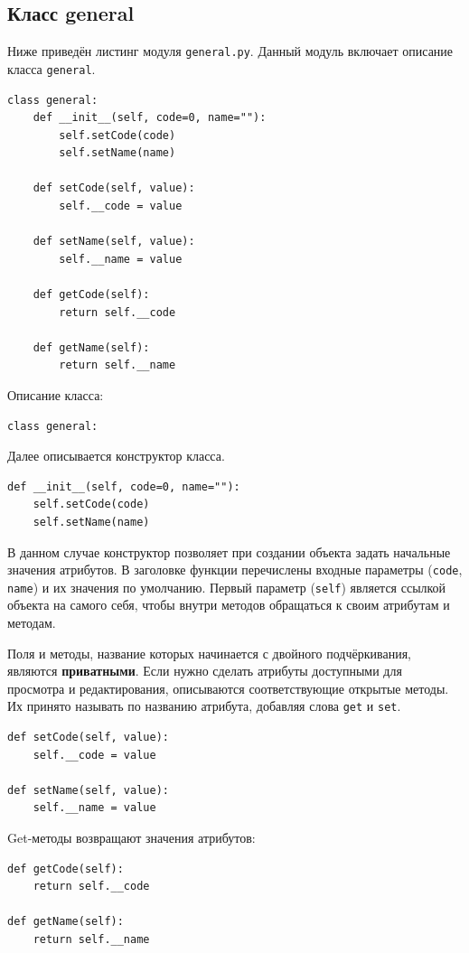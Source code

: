 \documentclass[a4paper,14pt]{extarticle}
\begin{document}
\subsection{Класс general}

Ниже приведён листинг модуля \texttt{general.py}. Данный модуль включает описание класса \texttt{general}.

\begin{lstlisting}[caption={Модуль \texttt{general.py}}]
class general:
    def __init__(self, code=0, name=""):
        self.setCode(code)
        self.setName(name)

    def setCode(self, value):
        self.__code = value

    def setName(self, value):
        self.__name = value

    def getCode(self):
        return self.__code

    def getName(self):
        return self.__name
\end{lstlisting}

Описание класса:
\begin{lstlisting}
class general:
\end{lstlisting}

Далее описывается конструктор класса.
\begin{lstlisting}
def __init__(self, code=0, name=""):
    self.setCode(code)
    self.setName(name)
\end{lstlisting}

В данном случае конструктор позволяет при создании объекта задать начальные значения атрибутов. В заголовке функции перечислены входные параметры (\texttt{code}, \texttt{name}) и их значения по умолчанию. Первый параметр (\texttt{self}) является ссылкой объекта на самого себя, чтобы внутри методов обращаться к своим атрибутам и методам.

Поля и методы, название которых начинается с двойного подчёркивания, являются \textbf{приватными}. Если нужно сделать атрибуты доступными для просмотра и редактирования, описываются соответствующие открытые методы. Их принято называть по названию атрибута, добавляя слова \texttt{get} и \texttt{set}.

\begin{lstlisting}
def setCode(self, value):
    self.__code = value

def setName(self, value):
    self.__name = value
\end{lstlisting}

Get-методы возвращают значения атрибутов:
\begin{lstlisting}
def getCode(self):
    return self.__code

def getName(self):
    return self.__name
\end{lstlisting}
\end{document}
